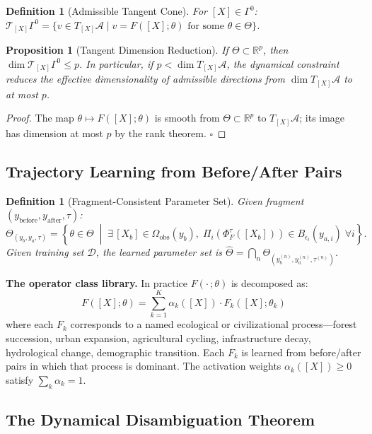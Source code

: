 \documentclass[12pt, oneside]{article}
\newtheorem{proposition}[theorem]{Proposition}
\newtheorem{definition}[theorem]{Definition}
\begin{document}
\begin{definition}[Admissible Tangent Cone]
For $[X] \in \Gamma^0$:
$\mathcal{T}_{[X]}\Gamma^0 = \{v \in T_{[X]}\mathcal{A} \mid v = F([X];\theta)
\text{ for some } \theta \in \Theta\}$.
\end{definition}

\begin{proposition}[Tangent Dimension Reduction]
If $\Theta \subset \mathbb{R}^p$, then $\dim \mathcal{T}_{[X]}\Gamma^0 \le p$.
In particular, if $p < \dim T_{[X]}\mathcal{A}$, the dynamical constraint reduces the
effective dimensionality of admissible directions from $\dim T_{[X]}\mathcal{A}$ to
at most $p$.
\end{proposition}
\begin{proof}
The map $\theta \mapsto F([X];\theta)$ is smooth from $\Theta \subset \mathbb{R}^p$ to
$T_{[X]}\mathcal{A}$; its image has dimension at most $p$ by the rank theorem. $\square$
\end{proof}

\subsection{Trajectory Learning from Before/After Pairs}

\begin{definition}[Fragment-Consistent Parameter Set]
Given fragment $(y_{\mathrm{before}}, y_{\mathrm{after}}, \tau)$:
\[
\Theta_{(y_b,y_a,\tau)} = \left\{ \theta \in \Theta \;\middle|\;
\exists\, [X_b] \in \Omega_{\mathrm{obs}}(y_b),\;
\Pi_i(\Phi^\tau_F([X_b])) \in B_{\epsilon_i}(y_{a,i})\; \forall i \right\}.
\]
Given training set $\mathcal{D}$, the learned parameter set is
$\hat{\Theta} = \bigcap_{n} \Theta_{(y_b^{(n)}, y_a^{(n)}, \tau^{(n)})}$.
\end{definition}

\textbf{The operator class library.} In practice $F(\cdot\,;\theta)$ is decomposed as:
\[
F([X];\theta) = \sum_{k=1}^K \alpha_k([X]) \cdot F_k([X];\theta_k)
\]
where each $F_k$ corresponds to a named ecological or civilizational process---forest
succession, urban expansion, agricultural cycling, infrastructure decay, hydrological
change, demographic transition. Each $F_k$ is learned from before/after pairs in which
that process is dominant. The activation weights $\alpha_k([X]) \ge 0$ satisfy
$\sum_k \alpha_k = 1$.

\subsection{The Dynamical Disambiguation Theorem}
\end{document}
